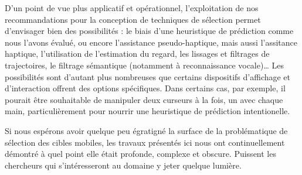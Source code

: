 	D'un point de vue plus applicatif et opérationnel, l'exploitation de nos recommandations pour la conception de techniques de sélection permet d'envisager bien des possibilités : le biais d'une heuristique de prédiction comme nous l'avons évalué, ou encore l'assistance pseudo-haptique, mais aussi l'assitance haptique, l'utilisation de l'estimation du regard, les lissages et filtrages de trajectoires, le filtrage sémantique (notamment à reconnaissance vocale)\ldots{} Les possibilités sont d'autant plus nombreuses que certains dispositifs d'affichage et d'interaction offrent des options spécifiques. Dans certains cas, par exemple, il pourait être souhaitable de manipuler deux curseurs à la fois, un avec chaque main, particulièrement pour nourrir une heuristique de prédiction intentionelle.
	
	Si nous espérons avoir quelque peu égratigné la surface de la problématique de sélection des cibles mobiles, les travaux présentés ici nous ont continuellement démontré à quel point elle était profonde, complexe et obscure. Puissent les chercheurs qui s'intéresseront au domaine y jeter quelque lumière.